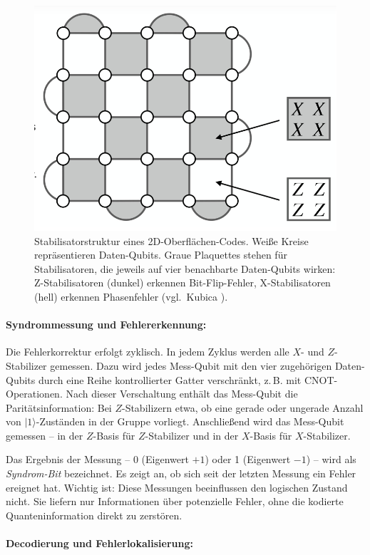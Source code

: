 \begin{figure}[H]
    \centering
    \includegraphics[width=0.6\linewidth]{images/error-correction/Abb4_Oberflaechencode_1.png}
    \caption{Stabilisatorstruktur eines 2D-Oberflächen-Codes. Weiße Kreise repräsentieren Daten-Qubits. Graue Plaquettes stehen für Stabilisatoren, die jeweils auf vier benachbarte Daten-Qubits wirken: Z-Stabilisatoren (dunkel) erkennen Bit-Flip-Fehler, X-Stabilisatoren (hell) erkennen Phasenfehler (vgl.\ Kubica \cite{kubica2023}).}
    \label{fig:oberflaechencode-stabilisatoren}
\end{figure}


\paragraph{Syndrommessung und Fehlererkennung:}

Die Fehlerkorrektur erfolgt zyklisch. In jedem Zyklus werden alle \(X\)- und \(Z\)-Stabilizer gemessen. Dazu wird jedes Mess-Qubit mit den vier zugehörigen Daten-Qubits durch eine Reihe kontrollierter Gatter verschränkt, z.\,B. mit CNOT-Operationen. Nach dieser Verschaltung enthält das Mess-Qubit die Paritätsinformation: Bei \(Z\)-Stabilizern etwa, ob eine gerade oder ungerade Anzahl von \( |1\rangle \)-Zuständen in der Gruppe vorliegt. Anschließend wird das Mess-Qubit gemessen – in der \(Z\)-Basis für \(Z\)-Stabilizer und in der \(X\)-Basis für \(X\)-Stabilizer.

Das Ergebnis der Messung – 0 (Eigenwert \(+1\)) oder 1 (Eigenwert \(-1\)) – wird als \emph{Syndrom-Bit} bezeichnet. Es zeigt an, ob sich seit der letzten Messung ein Fehler ereignet hat. Wichtig ist: Diese Messungen beeinflussen den logischen Zustand nicht. Sie liefern nur Informationen über potenzielle Fehler, ohne die kodierte Quanteninformation direkt zu zerstören.

\paragraph{Decodierung und Fehlerlokalisierung:}

